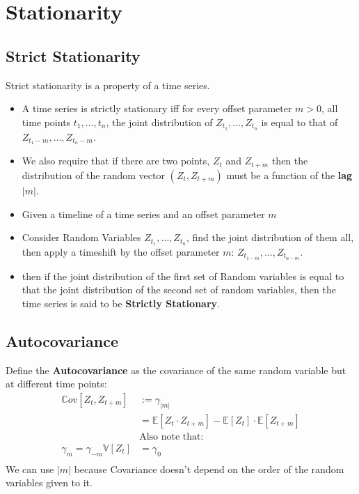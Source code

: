 \section{Stationarity}
\subsection{Strict Stationarity}
Strict stationarity is a property of a time series.
\begin{itemize}
    \item A time series is strictly stationary iff for every offset parameter
        $m > 0$, all time points $t_1, \dots, t_n$, the joint distribution of
        $Z_{t_1}, \dots, Z_{t_n}$ is equal to that of $Z_{t_1 - m},
        \dots, Z_{t_n-m}$.
    \item We also require that if there are two points, $Z_t$ and  $Z_{t+m}$
        then  the distribution of the random vector  $\left( Z_t,
        Z_{t+m}\right)$ must be a function of the \textbf{lag} $|m|$.
    \item Given a timeline of a time series and an offset parameter $m$ 
    \item Consider Random Variables $Z_{t_1}, \dots, Z_{t_n}$, find the joint
        distribution of them all, then apply a timeshift by the offset
        parameter $m$: $Z_{t_{1-m}}, \dots, Z_{t_{n-m}}$.
    \item then if the joint distribution of the first set of Random variables
        is equal to that the joint distribution of the second set of random
        variables, then the time series is said to be \textbf{Strictly
        Stationary}.
\end{itemize}

\subsection{Autocovariance}
Define the \textbf{Autocovariance} as the covariance of the same random
variable but at different time points:
\begin{equation*}
    \begin{aligned}
        \mathbb{C}ov[Z_t, Z_{t+m}] &:= \gamma_{|m|} \\ 
                &= \mathbb{E}[Z_t \cdot Z_{t+m}] - \mathbb{E}[Z_t] \cdot
                \mathbb{E}[Z_{t+m}] \\
        &\text{Also note that:} \\
        \gamma_m = \gamma_{-m}
        \mathbb{V}[Z_t] &= \gamma_0 \\
    \end{aligned}
\end{equation*}
We can use $|m|$ because Covariance doesn't depend on the order of
the random variables given to it. 

